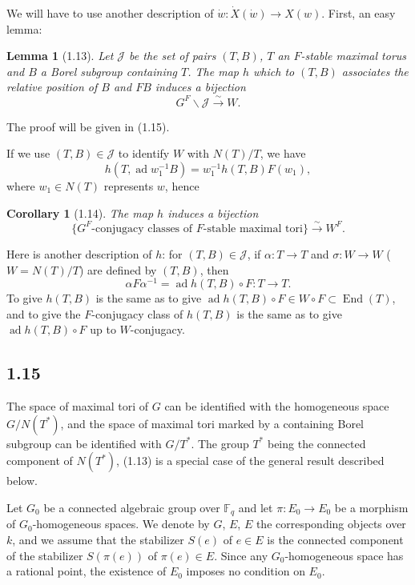 \documentclass[11pt]{amsart}
\theoremstyle{plain}
\newtheorem{lemma}[theorem]{Lemma}
\newtheorem{corollary}[theorem]{Corollary}
\theoremstyle{remark}
\DeclareMathOperator{\ad}{ad}
\DeclareMathOperator{\End}{End}
\begin{document}
We will have to use another description of $\dot{w}: \dot{X}(\dot{w}) \to X(w)$. First, an easy lemma:

\begin{lemma}[1.13]
Let $\mathcal{J}$ be the set of pairs $(T, B)$, $T$ an $F$-stable maximal torus and $B$ a Borel subgroup containing $T$. The map $h$ which to $(T, B)$ associates the relative position of $B$ and $FB$ induces a bijection
\[
G^F\backslash \mathcal{J} \xrightarrow{\sim} W.
\]
\end{lemma}

The proof will be given in (1.15).

If we use $(T, B) \in \mathcal{J}$ to identify $W$ with $N(T)/T$, we have
\begin{equation}\label{eq:1.13.1}
h(T, \ad w_1^{-1} B) = w_1^{-1} h(T, B) F(w_1),
\end{equation}
where $w_1 \in N(T)$ represents $w$, hence

\begin{corollary}[1.14]
The map $h$ induces a bijection
\[
\{G^F\text{-conjugacy classes of }F\text{-stable maximal tori}\} \xrightarrow{\sim} W^F.
\]
\end{corollary}

Here is another description of $h$: for $(T, B) \in \mathcal{J}$, if $\alpha: T \to T$ and $\sigma: W \to W$ ($W = N(T)/T$) are defined by $(T, B)$, then
\[
\alpha F \alpha^{-1} = \ad h(T, B) \circ F: T \longrightarrow T.
\]
To give $h(T, B)$ is the same as to give $\ad h(T, B) \circ F \in W \circ F \subset \End(T)$, and to give the $F$-conjugacy class of $h(T, B)$ is the same as to give $\ad h(T, B) \circ F$ up to $W$-conjugacy.

\subsection{1.15} The space of maximal tori of $G$ can be identified with the homogeneous space $G/N(T^*)$, and the space of maximal tori marked by a containing Borel subgroup can be identified with $G/T^*$. The group $T^*$ being the connected component of $N(T^*)$, (1.13) is a special case of the general result described below.

Let $G_0$ be a connected algebraic group over $\mathbb{F}_q$ and let $\pi: E_0 \to E_0$ be a morphism of $G_0$-homogeneous spaces. We denote by $G$, $E$, $E$ the corresponding objects over $k$, and we assume that the stabilizer $S(e)$ of $e \in E$ is the connected component of the stabilizer $S(\pi(e))$ of $\pi(e) \in E$. Since any $G_0$-homogeneous space has a rational point, the existence of $E_0$ imposes no condition on $E_0$.
\end{document}
